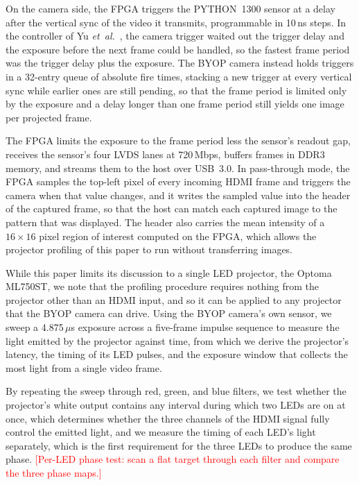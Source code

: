 \documentclass[10pt,journal,compsoc]{IEEEtran}
\newcommand{\SI}[2]{#1\,#2}
\newcommand{\micro}{\ensuremath{\mu}}
\newcommand{\nano}{n}\newcommand{\milli}{m}\newcommand{\mega}{M}
\newcommand{\second}{s}\newcommand{\hertz}{Hz}\newcommand{\metre}{m}
\newcommand{\pending}[1]{\textcolor{red}{[#1]}}
\begin{document}
On the camera side, the FPGA triggers the PYTHON~1300 sensor at a
delay after the vertical sync of the video it transmits, programmable in \SI{10}{\nano\second}
steps. In the controller of Yu \emph{et~al.}~\cite{yu2020dualprojector}, the camera trigger
waited out the trigger delay and the exposure before the next frame could be handled, so the
fastest frame period was the trigger delay plus the exposure. The BYOP camera instead holds
triggers in a 32-entry queue of absolute fire times, stacking a new trigger at every vertical
sync while earlier ones are still pending, so that the frame period is limited only by the
exposure and a delay longer than one frame period still yields one image per projected frame.

The FPGA
limits the exposure to the frame period less the sensor's readout gap, receives the sensor's four
LVDS lanes at \SI{720}{Mbps}, buffers frames in DDR3 memory, and streams them to the host over
USB~3.0. In pass-through mode, the FPGA
samples the top-left pixel of every incoming HDMI frame and triggers the camera when that value
changes, and it writes the sampled value into the header of the captured frame, so that the host
can match each captured image to the pattern that was displayed. The header also carries the
mean intensity of a $16\times16$ pixel region of interest computed on the FPGA, which allows the
projector profiling of this paper to run without transferring images.

While this paper limits its discussion to a single LED projector, the Optoma ML750ST, we note
that the profiling procedure requires nothing from the projector other than an HDMI input, and so
it can be applied to any projector that the BYOP camera can drive. Using the BYOP camera's own
sensor, we sweep a \SI{4.875}{\micro\second} exposure across a five-frame impulse sequence to
measure the light emitted by the projector against time, from which we derive the projector's
latency, the timing of its LED pulses, and the exposure window that collects the most light from a
single video frame.

By repeating the sweep through red, green, and blue filters, we test whether
the projector's white output contains any interval during which two LEDs are on at once, which
determines whether the three channels of the HDMI signal fully control the emitted light, and we
measure the timing of each LED's light separately, which is the first requirement for the three
LEDs to produce the same phase. \pending{Per-LED phase test: scan a flat target through each
filter and compare the three phase maps.}
\end{document}
